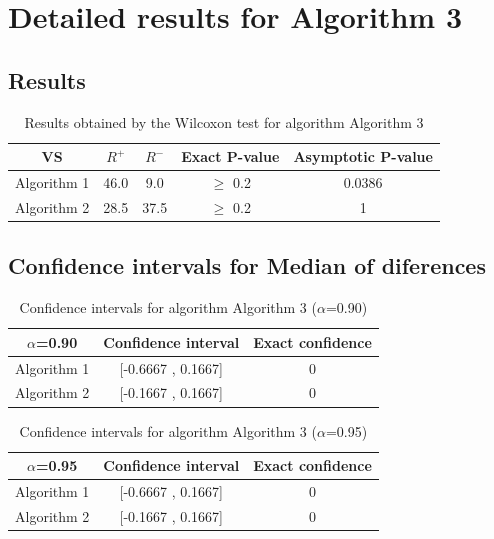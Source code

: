 \documentclass[a4paper,10pt]{article}
\begin{document}
 \clearpage 


\section{Detailed results for Algorithm 3}


\subsection{Results}

\begin{table}[!htp]
\centering\small
\begin{tabular}{
|c|c|c|c|c|}
\hline
 VS & $R^{+}$ & $R^{-}$ & Exact P-value & Asymptotic P-value \\ \hline 
Algorithm 1 & 46.0 & 9.0 & $\geq$ 0.2 & 0.0386\\ \hline 
Algorithm 2 & 28.5 & 37.5 & $\geq$ 0.2 & 1\\ \hline 

\end{tabular}
\caption{Results obtained by the Wilcoxon test for algorithm Algorithm 3}
\end{table}

\subsection{Confidence intervals for Median of diferences}

\begin{table}[!htp]
\centering\small
\begin{tabular}{
|c|c|c|}
\hline
 $\alpha$=0.90 & Confidence interval & Exact confidence \\ \hline 
Algorithm 1 & [-0.6667 , 0.1667] & 0\\ \hline 
Algorithm 2 & [-0.1667 , 0.1667] & 0\\ \hline 

\end{tabular}
\caption{Confidence intervals for algorithm Algorithm 3 ($\alpha$=0.90)}
\end{table}
\begin{table}[!htp]
\centering\small
\begin{tabular}{
|c|c|c|}
\hline
 $\alpha$=0.95 & Confidence interval & Exact confidence \\ \hline 
Algorithm 1 & [-0.6667 , 0.1667] & 0\\ \hline 
Algorithm 2 & [-0.1667 , 0.1667] & 0\\ \hline 

\end{tabular}
\caption{Confidence intervals for algorithm Algorithm 3 ($\alpha$=0.95)}
\end{table}

 \clearpage 
\end{document}
